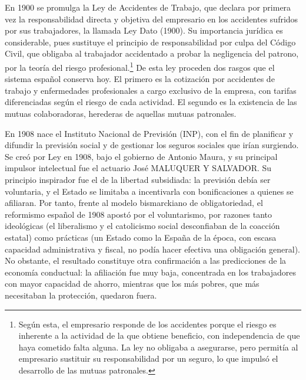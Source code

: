 \documentclass[10pt,a4paper]{article}
\begin{document}
En 1900 se promulga la Ley de Accidentes de Trabajo, que declara por primera vez la responsabilidad directa y objetiva del empresario en los accidentes sufridos por sus trabajadores, la llamada Ley Dato (1900). Su importancia jurídica es considerable, pues sustituye el principio de responsabilidad por culpa del Código Civil, que obligaba al trabajador accidentado a probar la negligencia del patrono, por la teoría del riesgo profesional.\footnote{Según esta, el empresario responde de los accidentes porque el riesgo es inherente a la actividad de la que obtiene beneficio, con independencia de que haya cometido falta alguna. La ley no obligaba a asegurarse, pero permitía al empresario sustituir su responsabilidad por un seguro, lo que impulsó el desarrollo de las mutuas patronales.
} De esta ley proceden dos rasgos que el sistema español conserva hoy. El primero es la cotización por accidentes de trabajo y enfermedades profesionales a cargo exclusivo de la empresa, con tarifas diferenciadas según el riesgo de cada actividad. El segundo es la existencia de las mutuas colaboradoras, herederas de aquellas mutuas patronales.

En 1908 nace el Instituto Nacional de Previsión (INP), con el fin de planificar y difundir la previsión social y de gestionar los seguros sociales que irían surgiendo. Se creó por Ley en 1908, bajo el gobierno de Antonio Maura, y su principal impulsor intelectual fue el actuario José MALUQUER Y SALVADOR. Su principio inspirador fue el de la libertad subsidiada: la previsión debía ser voluntaria, y el Estado se limitaba a incentivarla con bonificaciones a quienes se afiliaran. Por tanto, frente al modelo bismarckiano de obligatoriedad, el reformismo español de 1908 apostó por el voluntarismo, por razones tanto ideológicas (el liberalismo y el catolicismo social desconfiaban de la coacción estatal) como prácticas (un Estado como la España de la época, con escasa capacidad administrativa y fiscal, no podía hacer efectiva una obligación general). No obstante, el resultado constituye otra confirmación a las predicciones de la economía conductual: la afiliación fue muy baja, concentrada en los trabajadores con mayor capacidad de ahorro, mientras que los más pobres, que más necesitaban la protección, quedaron fuera. 
\end{document}
